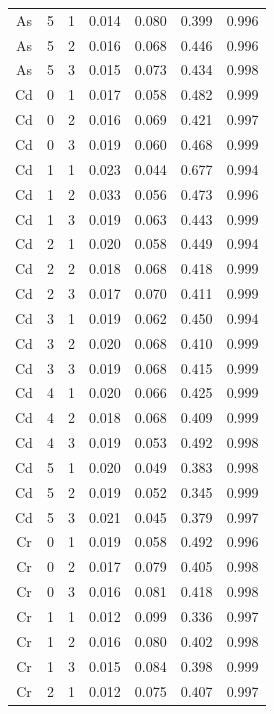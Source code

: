 \documentclass[ms, hidelinks]{uncgdissertationexp3}
\theoremstyle{plain}
\theoremstyle{definition}
\theoremstyle{remark}
\begin{document}
\begin{longtable}{ccccccc}
  As & 5 & 1 & 0.014 & 0.080 & 0.399 & 0.996\\
  \rowcolor{gray!6}  As & 5 & 2 & 0.016 & 0.068 & 0.446 & 0.996\\
  As & 5 & 3 & 0.015 & 0.073 & 0.434 & 0.998\\
  \rowcolor{gray!6}  Cd & 0 & 1 & 0.017 & 0.058 & 0.482 & 0.999\\
  Cd & 0 & 2 & 0.016 & 0.069 & 0.421 & 0.997\\
  \rowcolor{gray!6}  Cd & 0 & 3 & 0.019 & 0.060 & 0.468 & 0.999\\
  Cd & 1 & 1 & 0.023 & 0.044 & 0.677 & 0.994\\
  \rowcolor{gray!6}  Cd & 1 & 2 & 0.033 & 0.056 & 0.473 & 0.996\\
  Cd & 1 & 3 & 0.019 & 0.063 & 0.443 & 0.999\\
  \rowcolor{gray!6}  Cd & 2 & 1 & 0.020 & 0.058 & 0.449 & 0.994\\
  Cd & 2 & 2 & 0.018 & 0.068 & 0.418 & 0.999\\
  \rowcolor{gray!6}  Cd & 2 & 3 & 0.017 & 0.070 & 0.411 & 0.999\\
  Cd & 3 & 1 & 0.019 & 0.062 & 0.450 & 0.994\\
  \rowcolor{gray!6}  Cd & 3 & 2 & 0.020 & 0.068 & 0.410 & 0.999\\
  Cd & 3 & 3 & 0.019 & 0.068 & 0.415 & 0.999\\
  \rowcolor{gray!6}  Cd & 4 & 1 & 0.020 & 0.066 & 0.425 & 0.999\\
  Cd & 4 & 2 & 0.018 & 0.068 & 0.409 & 0.999\\
  \rowcolor{gray!6}  Cd & 4 & 3 & 0.019 & 0.053 & 0.492 & 0.998\\
  Cd & 5 & 1 & 0.020 & 0.049 & 0.383 & 0.998\\
  \rowcolor{gray!6}  Cd & 5 & 2 & 0.019 & 0.052 & 0.345 & 0.999\\
  Cd & 5 & 3 & 0.021 & 0.045 & 0.379 & 0.997\\
  \rowcolor{gray!6}  Cr & 0 & 1 & 0.019 & 0.058 & 0.492 & 0.996\\
  Cr & 0 & 2 & 0.017 & 0.079 & 0.405 & 0.998\\
  \rowcolor{gray!6}  Cr & 0 & 3 & 0.016 & 0.081 & 0.418 & 0.998\\
  Cr & 1 & 1 & 0.012 & 0.099 & 0.336 & 0.997\\
  \rowcolor{gray!6}  Cr & 1 & 2 & 0.016 & 0.080 & 0.402 & 0.998\\
  Cr & 1 & 3 & 0.015 & 0.084 & 0.398 & 0.999\\
  \rowcolor{gray!6}  Cr & 2 & 1 & 0.012 & 0.075 & 0.407 & 0.997\\

\end{longtable}
\end{document}
